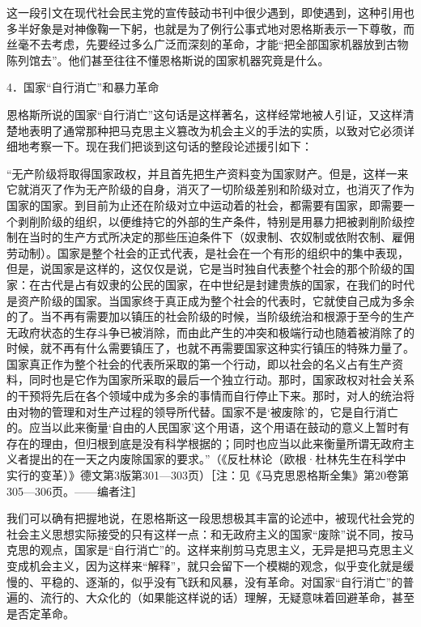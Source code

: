 \documentclass[UTF8, 12pt, a4paper]{ctexrep}
\begin{document}
这一段引文在现代社会民主党的宣传鼓动书刊中很少遇到，即使遇到，这种引用也多半好象是对神像鞠一下躬，也就是为了例行公事式地对恩格斯表示一下尊敬，而丝毫不去考虑，先要经过多么广泛而深刻的革命，才能“把全部国家机器放到古物陈列馆去”。他们甚至往往不懂恩格斯说的国家机器究竟是什么。

4．国家“自行消亡”和暴力革命

恩格斯所说的国家“自行消亡”这句话是这样著名，这样经常地被人引证，又这样清楚地表明了通常那种把马克思主义篡改为机会主义的手法的实质，以致对它必须详细地考察一下。现在我们把谈到这句话的整段论述援引如下：

“无产阶级将取得国家政权，并且首先把生产资料变为国家财产。但是，这样一来它就消灭了作为无产阶级的自身，消灭了一切阶级差别和阶级对立，也消灭了作为国家的国家。到目前为止还在阶级对立中运动着的社会，都需要有国家，即需要一个剥削阶级的组织，以便维持它的外部的生产条件，特别是用暴力把被剥削阶级控制在当时的生产方式所决定的那些压迫条件下（奴隶制、农奴制或依附农制、雇佣劳动制）。国家是整个社会的正式代表，是社会在一个有形的组织中的集中表现，但是，说国家是这样的，这仅仅是说，它是当时独自代表整个社会的那个阶级的国家：在古代是占有奴隶的公民的国家，在中世纪是封建贵族的国家，在我们的时代是资产阶级的国家。当国家终于真正成为整个社会的代表时，它就使自己成为多余的了。当不再有需要加以镇压的社会阶级的时候，当阶级统治和根源于至今的生产无政府状态的生存斗争已被消除，而由此产生的冲突和极端行动也随着被消除了的时候，就不再有什么需要镇压了，也就不再需要国家这种实行镇压的特殊力量了。国家真正作为整个社会的代表所采取的第一个行动，即以社会的名义占有生产资料，同时也是它作为国家所采取的最后一个独立行动。那时，国家政权对社会关系的干预将先后在各个领域中成为多余的事情而自行停止下来。那时，对人的统治将由对物的管理和对生产过程的领导所代替。国家不是‘被废除’的，它是自行消亡的。应当以此来衡量‘自由的人民国家’这个用语，这个用语在鼓动的意义上暂时有存在的理由，但归根到底是没有科学根据的；同时也应当以此来衡量所谓无政府主义者提出的在一天之内废除国家的要求。”（《反杜林论（欧根·杜林先生在科学中实行的变革）》德文第3版第301—303页）［注：见《马克思恩格斯全集》第20卷第305—306页。——编者注］

我们可以确有把握地说，在恩格斯这一段思想极其丰富的论述中，被现代社会党的社会主义思想实际接受的只有这样一点：和无政府主义的国家“废除”说不同，按马克思的观点，国家是“自行消亡”的。这样来削剪马克思主义，无异是把马克思主义变成机会主义，因为这样来“解释”，就只会留下一个模糊的观念，似乎变化就是缓慢的、平稳的、逐渐的，似乎没有飞跃和风暴，没有革命。对国家“自行消亡”的普遍的、流行的、大众化的（如果能这样说的话）理解，无疑意味着回避革命，甚至是否定革命。
\end{document}
